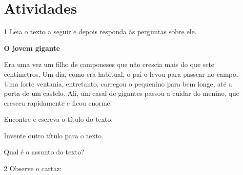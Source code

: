 \section*{Atividades}

\num{1} Leia o texto a seguir e depois responda às perguntas sobre ele. 

\begin{myquote}
\begin{center}
\textbf{O jovem gigante}
\end{center}

Era uma vez um filho de camponeses que não crescia mais do que sete
centímetros. Um dia, como era habitual, o pai o levou para passear no
campo. Uma forte ventania, entretanto, carregou o pequenino para bem
longe, até a porta de um castelo. Ali, um casal de gigantes passou a
cuidar do menino, que cresceu rapidamente e ficou enorme.

\end{myquote}

\begin{escolha}
\item Encontre e escreva o título do texto.


\item Invente outro título para o texto.


\item Qual é o assunto do texto?

\end{escolha}

\pagebreak
\num{2} Observe o cartaz:


